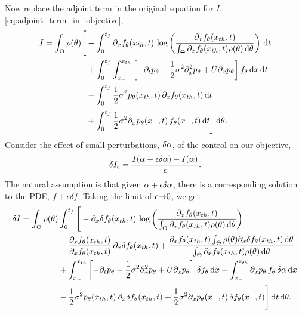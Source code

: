 \documentclass[12pt]{article}
\def \tf {{t_f}}
\begin{document}
Now replace the adjoint term in the original equation for $I$,
\cref{eq:adjoint_term_in_objective},
\begin{align*}
I=  
\int_\Theta  \rho(\th) \Bigg[ 
&-\int_0^{\tf} 
	  \di_xf_\th(\xth, t)  \, 
		\log \left( \frac{\di_xf_\th(\xth, t)}
						{\int_\Theta \di_xf_\th(\xth, t)\rho(\th)\intd{\th} } \right)
\intd{t} 
\\ &+
\int_0^{\tf}\int_{x_-}^{\xth} 
	\left[-\di_tp_\th -  \frac{1 }{2}\s^2\di^2_xp_\th + U
          \di_xp_\th \right]  f_\th
\intd{x}\intd{t}
\\ 
&- \int_{0}^{\tf} \frac{1 }{2}\s^2 p_\th(\xth,t) \, \di_xf_\th(\xth,t) \intd{t}
\\
& + \int_{0}^{\tf} \frac{1 }{2}\s^2\di_xp_\th(x_-,t) \, f_\th(x_-,t) \intd{t}
\Bigg]				\intd{\th}	.   
\end{align*}
Consider the effect of small
perturbations, $\delta {\alpha}$, of the control on our objective, 
$$
\delta I_\epsilon =\frac{I({\alpha} + \epsilon \delta {\alpha}) - I({\alpha})}{{\epsilon}}.
$$
The natural assumption is that given ${\alpha} + \epsilon \delta {\alpha}$, there is a
corresponding solution to the PDE, $f+ \epsilon \delta f$. 
Taking the limit of $\epsilon{\rightarrow}0$, we get
\begin{equation}
\begin{aligned}
\delta I =  
\int_\Theta  \rho(\th) &\int_0^{\tf} \Bigg[ 
-   \di_x \delta f_\th(\xth, t)  \, 
		\log \left( \frac{\di_xf_\th(\xth, t)}
						{\int_\Theta \di_xf_\th(\xth, t)\rho(\th)\intd{\th} } \right)
\\ 
	&
-  \frac{ \di_x f_\th(\xth, t)}{ \di_x f_\th(\xth, t)}  \, \di_x
		\delta f_\th(\xth, t)
+    \frac{ \di_x f_\th(\xth, t) \int_\Theta \rho(\th) \di_x \delta f_\th(\xth, t) 	\intd{\th}	}{	{\int_\Theta \di_xf_\th(\xth,
	t)\rho(\th)\intd{\th} }} 		 			 
\\
 &+ \int_{x_-}^{\xth} 
	\left[-\di_tp_\th -  \frac{1 }{2}\s^2\di^2_xp_\th  + U \di_xp_\th \right]\,  \delta f_\th
\intd{x}
- \int_{x_-}^{\xth}
\di_xp_\th \, f_\th\, \delta \a \intd{x}
\\
 &-   \frac{1 }{2}\s^2 p_\th(\xth,t) \, \di_x\delta f_\th(\xth,t) 
+  \frac{1 }{2}\s^2\di_xp_\th(x_-,t) \, \delta f_\th(x_-,t)
  \Bigg]			 \intd{t}	\intd{\th}	.   
\end{aligned} 
\label{eq:differential_I_before_refactoring}
\end{equation}
\end{document}
